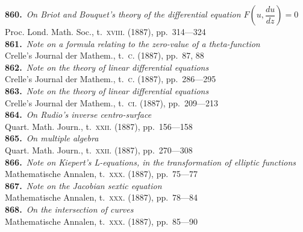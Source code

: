 \documentclass[11pt,a4paper]{article}
\providecommand{\textsc}[1]{{\scshape #1}}
\begin{document}
\small
\noindent\textbf{860.}~\textit{On Briot and Bouquet's theory of the differential equation
$F\!\left(u,\dfrac{du}{dz}\right) = 0$}~\\
\hspace*{2em}Proc. Lond. Math. Soc., t.~\textsc{xviii}. (1887), pp.~314---324\\[0.3em]
\textbf{861.}~\textit{Note on a formula relating to the zero-value of a theta-function}~\\
\hspace*{2em}Crelle's Journal der Mathem., t.~\textsc{c}. (1887), pp.~87, 88\\[0.3em]
\textbf{862.}~\textit{Note on the theory of linear differential equations}~\\
\hspace*{2em}Crelle's Journal der Mathem., t.~\textsc{c}. (1887), pp.~286---295\\[0.3em]
\textbf{863.}~\textit{Note on the theory of linear differential equations}~\\
\hspace*{2em}Crelle's Journal der Mathem., t.~\textsc{ci}. (1887), pp.~209---213\\[0.3em]
\textbf{864.}~\textit{On Rudio's inverse centro-surface}~\\
\hspace*{2em}Quart. Math. Journ., t.~\textsc{xxii}. (1887), pp.~156---158\\[0.3em]
\textbf{865.}~\textit{On multiple algebra}~\\
\hspace*{2em}Quart. Math. Journ., t.~\textsc{xxii}. (1887), pp.~270---308\\[0.3em]
\textbf{866.}~\textit{Note on Kiepert's L-equations, in the transformation of elliptic functions}~\\
\hspace*{2em}Mathematische Annalen, t.~\textsc{xxx}. (1887), pp.~75---77\\[0.3em]
\textbf{867.}~\textit{Note on the Jacobian sextic equation}~\\
\hspace*{2em}Mathematische Annalen, t.~\textsc{xxx}. (1887), pp.~78---84\\[0.3em]
\textbf{868.}~\textit{On the intersection of curves}~\\
\hspace*{2em}Mathematische Annalen, t.~\textsc{xxx}. (1887), pp.~85---90\\[0.3em]
\end{document}
